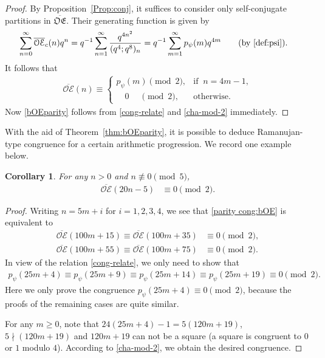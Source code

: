 \documentclass[12pt,reqno]{amsart}
\numberwithin{equation}{section}
\theoremstyle{plain}
\newtheorem{corollary}[theorem]{Corollary}
\theoremstyle{definition}
\def\bOE{\overline{\mathcal{OE}}}
\def\bfOE{\overline{\mathfrak{OE}}}
\begin{document}
\begin{proof}
By Proposition~\ref{Prop:conj}, it suffices to consider only self-conjugate partitions in $\bfOE$. Their
generating function is given by
\begin{align*}
\sum_{n=0}^\infty\bOE_c(n)q^n &= q^{-1}\sum_{n=1}^{\infty}\frac{q^{4n^2}}{(q^4;q^8)_n}
=q^{-1}\sum_{m=1}^{\infty}p_{\psi}(m)q^{4m}\qquad\textrm{(by~\eqref{def:psi})}.
\end{align*}
It follows that
\begin{align}
\bOE(n)\equiv
\begin{cases}
p_\psi(m)\pmod2, &\textrm{if}\;\;n=4m-1,\\
\quad0\quad\;\pmod 2, &\textrm{otherwise.}
\end{cases}\label{cong-relate}
\end{align}
Now \eqref{bOEparity} follows from \eqref{cong-relate} and \eqref{cha-mod-2} immediately.
\end{proof}

With the aid of Theorem~\ref{thm:bOEparity}, it is possible to deduce Ramanujan-type congruence for a certain
arithmetic progression. We record one example below.

\begin{corollary}\label{thm:psi-mod2}
For any $n>0$ and $n\not\equiv 0\pmod 5$,
\begin{align}
\bOE(20n-5)&\equiv0\pmod 2.\label{parity cong:bOE}
\end{align}
\end{corollary}
\begin{proof}
Writing $n=5m+i$ for $i=1,2,3,4$, we see that \eqref{parity cong:bOE} is equivalent to
\begin{align*}
\bOE(100m+15)\equiv\bOE(100m+35) &\equiv0\pmod 2,\\
\bOE(100m+55)\equiv\bOE(100m+75) &\equiv0\pmod 2.
\end{align*}
In view of the relation \eqref{cong-relate}, we only need to show that
\begin{align}
p_\psi(25m+4)\equiv p_\psi(25m+9)\equiv p_{\psi}(25m+14)\equiv
p_\psi(25m+19)\equiv0\pmod 2.\label{parity cong:psi}
\end{align}
Here we only prove the congruence $p_{\psi}(25m+4)\equiv0\pmod{2}$, because the proofs of the remaining cases
are quite similar.

For any $m\geq0$, note that $24(25m+4)-1=5(120m+19)$, $5\nmid(120m+19)$ and $120m+19$ can not be a square (a
square is congruent to $0$ or $1$ modulo $4$). According to \eqref{cha-mod-2}, we obtain the desired congruence.
\end{proof}
\end{document}
